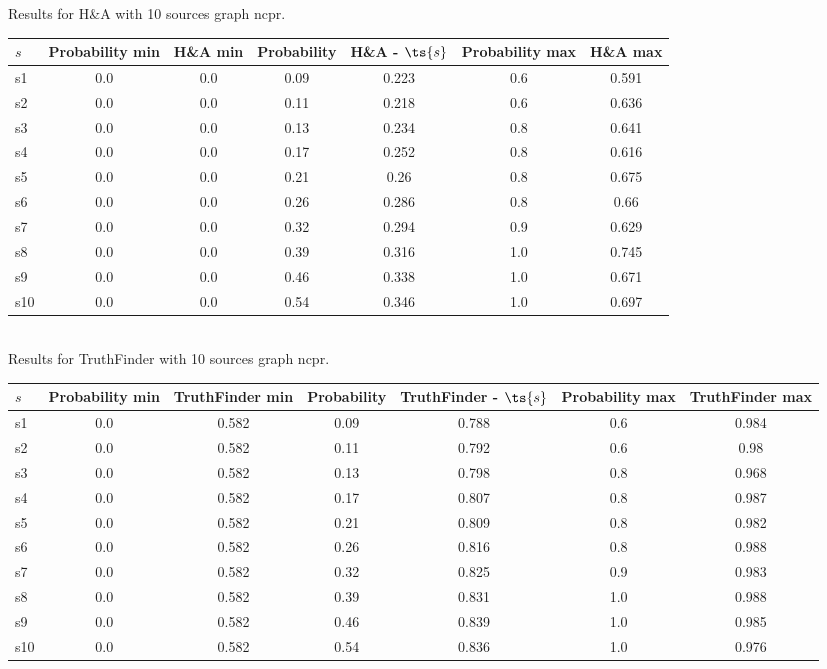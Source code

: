 \documentclass{article}
\begin{document}
\noindent Results for H\&A with 10 sources graph ncpr.

\noindent\begin{tabular}{|l|c|c|c|c|c|c|}
\hline
$s$& Probability min & H\&A min & Probability & H\&A - $\ts{s}$ & Probability max & H\&A max\\
\hline
s1 &0.0 & 0.0 & 0.09 & 0.223 & 0.6 & 0.591\\
\hline
s2 &0.0 & 0.0 & 0.11 & 0.218 & 0.6 & 0.636\\
\hline
s3 &0.0 & 0.0 & 0.13 & 0.234 & 0.8 & 0.641\\
\hline
s4 &0.0 & 0.0 & 0.17 & 0.252 & 0.8 & 0.616\\
\hline
s5 &0.0 & 0.0 & 0.21 & 0.26 & 0.8 & 0.675\\
\hline
s6 &0.0 & 0.0 & 0.26 & 0.286 & 0.8 & 0.66\\
\hline
s7 &0.0 & 0.0 & 0.32 & 0.294 & 0.9 & 0.629\\
\hline
s8 &0.0 & 0.0 & 0.39 & 0.316 & 1.0 & 0.745\\
\hline
s9 &0.0 & 0.0 & 0.46 & 0.338 & 1.0 & 0.671\\
\hline
s10 &0.0 & 0.0 & 0.54 & 0.346 & 1.0 & 0.697\\
\hline
\end{tabular}\\

\noindent Results for TruthFinder with 10 sources graph ncpr.

\noindent\begin{tabular}{|l|c|c|c|c|c|c|}
\hline
$s$& Probability min & TruthFinder min & Probability & TruthFinder - $\ts{s}$ & Probability max & TruthFinder max\\
\hline
s1 &0.0 & 0.582 & 0.09 & 0.788 & 0.6 & 0.984\\
\hline
s2 &0.0 & 0.582 & 0.11 & 0.792 & 0.6 & 0.98\\
\hline
s3 &0.0 & 0.582 & 0.13 & 0.798 & 0.8 & 0.968\\
\hline
s4 &0.0 & 0.582 & 0.17 & 0.807 & 0.8 & 0.987\\
\hline
s5 &0.0 & 0.582 & 0.21 & 0.809 & 0.8 & 0.982\\
\hline
s6 &0.0 & 0.582 & 0.26 & 0.816 & 0.8 & 0.988\\
\hline
s7 &0.0 & 0.582 & 0.32 & 0.825 & 0.9 & 0.983\\
\hline
s8 &0.0 & 0.582 & 0.39 & 0.831 & 1.0 & 0.988\\
\hline
s9 &0.0 & 0.582 & 0.46 & 0.839 & 1.0 & 0.985\\
\hline
s10 &0.0 & 0.582 & 0.54 & 0.836 & 1.0 & 0.976\\
\hline
\end{tabular}\\
\end{document}
